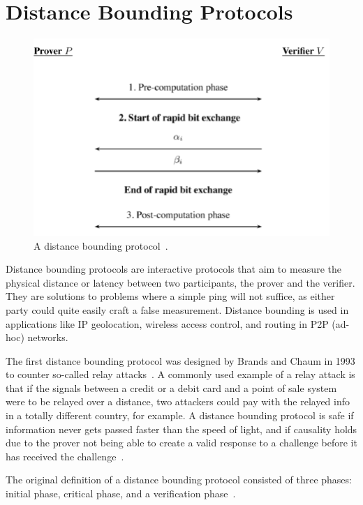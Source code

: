 \section{Distance Bounding Protocols}
\begin{figure}
  \includegraphics[width=\textwidth]{pictures/distance_bounding.png}
  \caption{A distance bounding protocol~\cite{Peeters2011-dq}.}
  \label{Distance Bounding Protocol}
\end{figure}
Distance bounding protocols are interactive protocols that aim to measure the physical distance or latency between two participants, the prover and the verifier. They are solutions to problems where a simple ping will not suffice, as either party could quite easily craft a false measurement. Distance bounding is used in applications like IP geolocation, wireless access control, and routing in P2P (ad-hoc) networks.

The first distance bounding protocol was designed by Brands and Chaum in 1993 to counter so-called relay attacks~\cite{Boureanu_undated-bn, Brands1994-hz}. A commonly used example of a relay attack is that if the signals between a credit or a debit card and a point of sale system were to be relayed over a distance, two attackers could pay with the relayed info in a totally different country, for example. A distance bounding protocol is safe if information never gets passed faster than the speed of light, and if causality holds due to the prover not being able to create a valid response to a challenge before it has received the challenge~\cite{Boureanu_undated-bn}.

The original definition of a distance bounding protocol consisted of three phases: initial phase, critical phase, and a verification phase~\cite{Brands1994-hz, Mauw2018-uz}.

